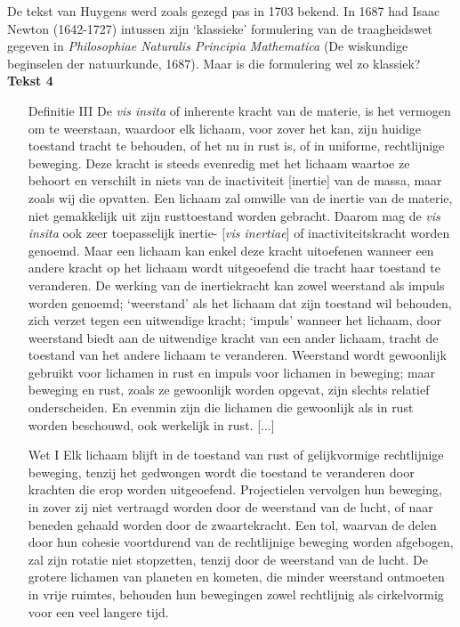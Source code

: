 \newpage

De tekst van Huygens werd zoals gezegd pas in 1703 bekend. In 1687 had Isaac Newton (1642-1727) intussen zijn `klassieke' formulering van de traagheidswet gegeven in \textit{Philosophiae Naturalis Principia Mathematica} (De wiskundige beginselen der natuurkunde, 1687). Maar is die formulering wel zo klassiek?
\newline
\newline
\textbf{Tekst 4}
{\footnotesize
\begin{enumerate}
\item[Definitie III] De \textit{vis insita} of inherente kracht van de materie, is het vermogen om te weerstaan, waardoor elk lichaam, voor zover het kan, zijn huidige toestand tracht te behouden, of het nu in rust is, of in uniforme, rechtlijnige beweging.
\newline
Deze kracht is steeds evenredig met het lichaam waartoe ze behoort en verschilt in niets van de
inactiviteit [inertie] van de massa, maar zoals wij die opvatten. Een lichaam zal omwille van de
inertie van de materie, niet gemakkelijk uit zijn rusttoestand worden gebracht. Daarom mag de \textit{vis
insita} ook zeer toepasselijk inertie- [\textit{vis inertiae}] of inactiviteitskracht worden genoemd. Maar een lichaam kan enkel deze kracht uitoefenen wanneer een andere kracht op het lichaam wordt uitgeoefend die tracht haar toestand te veranderen. De werking van de inertiekracht kan zowel weerstand als impuls worden genoemd; `weerstand' als het lichaam dat zijn toestand wil behouden, zich verzet tegen een uitwendige kracht; `impuls' wanneer het lichaam, door weerstand biedt aan de uitwendige kracht van een ander lichaam, tracht de toestand van het andere lichaam te veranderen. Weerstand wordt gewoonlijk gebruikt voor lichamen in rust en impuls voor lichamen in beweging; maar beweging en rust, zoals ze gewoonlijk worden opgevat, zijn slechts relatief onderscheiden. En evenmin zijn die lichamen die gewoonlijk als in rust worden beschouwd, ook werkelijk in rust. [...]

\item[Wet I] Elk lichaam blijft in de toestand van rust of gelijkvormige rechtlijnige beweging, tenzij het gedwongen wordt die toestand te veranderen door krachten die erop worden uitgeoefend.
\newline
Projectielen vervolgen hun beweging, in zover zij niet vertraagd worden door de weerstand van de lucht, of naar beneden gehaald worden door de zwaartekracht. Een tol, waarvan de delen door hun cohesie voortdurend van de rechtlijnige beweging worden afgebogen, zal zijn rotatie niet stopzetten, tenzij door de weerstand van de lucht. De grotere lichamen van planeten en kometen, die minder weerstand ontmoeten in vrije ruimtes, behouden hun bewegingen zowel rechtlijnig als cirkelvormig voor een veel langere tijd.

\end{enumerate}
}


